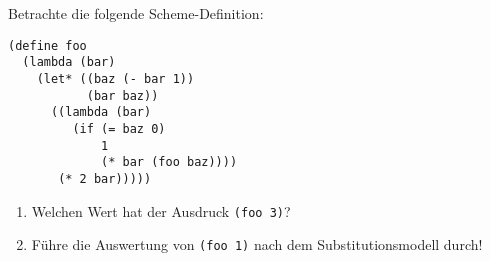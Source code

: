 \begin{aufgabe}
Betrachte die folgende Scheme-Definition:
%
\begin{verbatim}
(define foo
  (lambda (bar)
    (let* ((baz (- bar 1))
           (bar baz))
      ((lambda (bar)
         (if (= baz 0)
             1
             (* bar (foo baz))))
       (* 2 bar)))))
\end{verbatim}
  \begin{enumerate}
  \item Welchen Wert hat der Ausdruck \texttt{(foo 3)}?
  \item Führe die Auswertung von \texttt{(foo 1)} nach dem
    Substitutionsmodell durch!
  \end{enumerate}
\end{aufgabe}

